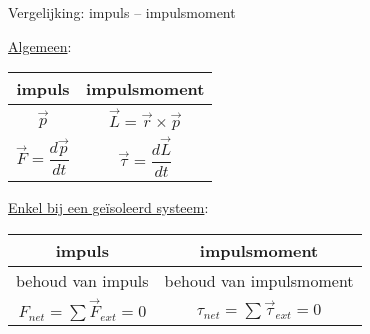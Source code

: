 \begin{app}{Vergelijking: impuls – impulsmoment}
    \begin{minipage}{.4\textwidth}
        \begin{center}
            
            \underline{Algemeen}: \\
            \vspace{0.25cm}
            \def\arraystretch{2.5}
            \begin{tabular}{c|c}
                impuls & impulsmoment \\ \hline
                $ \Vec{p} $ & $ \Vec{L} = \Vec{r} \times \Vec{p} $ \\ 
                $ \Vec{F} = \dfrac{d\Vec{p}}{dt} $ &  $ \Vec{\tau} = \dfrac{d\Vec{L}}{dt} $
            \end{tabular}
    
        \end{center}
    \end{minipage} 
    \begin{minipage}{.6\textwidth}
        \begin{center}
                
            \underline{Enkel bij een geïsoleerd systeem}: \\
            \vspace{0.25cm}
            \def\arraystretch{2.5}
            \begin{tabular}{c|c}
                impuls & impulsmoment \\ \hline
                behoud van impuls & behoud van impulsmoment \\ 
                $ F_{net} = \sum \Vec{F}_{ext} = 0 $ & $ \tau_{net} = \sum \Vec{\tau}_{ext} = 0 $
            \end{tabular}
        
        \end{center}
    \end{minipage}
\end{app}

